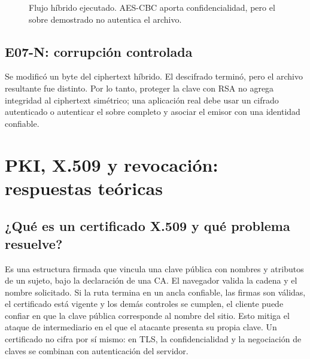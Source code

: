 \documentclass[11pt,a4paper]{article}
\begin{document}
\begin{figure}[H]
\centering
{}
\caption{Flujo híbrido ejecutado. AES-CBC aporta confidencialidad, pero el
sobre demostrado no autentica el archivo.}
\end{figure}

\subsection{E07-N: corrupción controlada}
Se modificó un byte del ciphertext híbrido. El descifrado terminó, pero el
archivo resultante fue distinto. Por lo tanto, proteger la clave con RSA no
agrega integridad al ciphertext simétrico; una aplicación real debe usar un
cifrado autenticado o autenticar el sobre completo y asociar el emisor con una
identidad confiable.

\section{PKI, X.509 y revocación: respuestas teóricas}
\subsection{¿Qué es un certificado X.509 y qué problema resuelve?}
Es una estructura firmada que vincula una clave pública con nombres y atributos
de un sujeto, bajo la declaración de una CA. El navegador valida la cadena y
el nombre solicitado. Si la ruta termina en un ancla confiable, las firmas son
válidas, el certificado está vigente y los demás controles se cumplen, el
cliente puede confiar en que la clave pública corresponde al nombre del sitio.
Esto mitiga el ataque de intermediario en el que el atacante presenta su propia
clave. Un certificado no cifra por sí mismo: en TLS, la confidencialidad y la
negociación de claves se combinan con autenticación del servidor.
\end{document}
